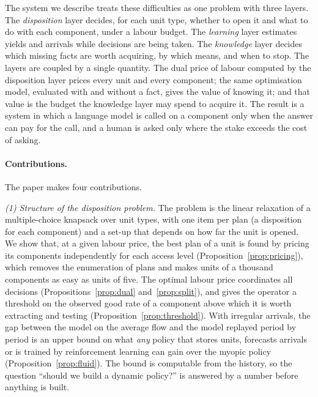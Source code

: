 The system we describe treats these difficulties as one problem with three layers. The \emph{disposition} layer
decides, for each unit type, whether to open it and what to do with each component, under a labour budget. The
\emph{learning} layer estimates yields and arrivals while decisions are being taken. The \emph{knowledge} layer
decides which missing facts are worth acquiring, by which means, and when to stop. The layers are coupled by a single
quantity. The dual price of labour computed by the disposition layer prices every unit and every component; the same
optimisation model, evaluated with and without a fact, gives the value of knowing it; and that value is the budget
the knowledge layer may spend to acquire it. The result is a system in which a language model is called on a
component only when the answer can pay for the call, and a human is asked only where the stake exceeds the cost of
asking.

\paragraph{Contributions.} The paper makes four contributions.

\emph{(1) Structure of the disposition problem.} The problem is the linear relaxation of a multiple-choice knapsack
over unit types, with one item per plan (a disposition for each component) and a set-up that depends on how far the
unit is opened. We show that, at a given labour price, the best plan of a unit is found by pricing its components
independently for each access level (Proposition~\ref{prop:pricing}), which removes the enumeration of plans and makes
units of a thousand components as easy as units of five. The optimal labour price coordinates all decisions
(Propositions~\ref{prop:dual} and~\ref{prop:split}), and gives the operator a threshold on the observed good rate of
a component above which it is worth extracting and testing (Proposition~\ref{prop:threshold}). With irregular
arrivals, the gap between the model on the average flow and the model replayed period by period is an upper bound on
what \emph{any} policy that stores units, forecasts arrivals or is trained by reinforcement learning can gain over
the myopic policy (Proposition~\ref{prop:fluid}). The bound is computable from the history, so the question ``should
we build a dynamic policy?'' is answered by a number before anything is built.


